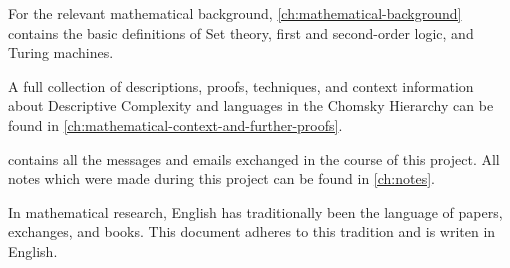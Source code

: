 For the relevant mathematical background, \cref{ch:mathematical-background} contains the basic definitions of Set theory, first and second-order logic, and Turing machines.

A full collection of descriptions, proofs, techniques, and context information about Descriptive Complexity and languages in the Chomsky Hierarchy can be found in \cref{ch:mathematical-context-and-further-proofs}.

 contains all the messages and emails exchanged in the course of this project.
All notes which were made during this project can be found in \cref{ch:notes}.

In mathematical research, English has traditionally been the language of papers, exchanges, and books.
This document adheres to this tradition and is writen in English.